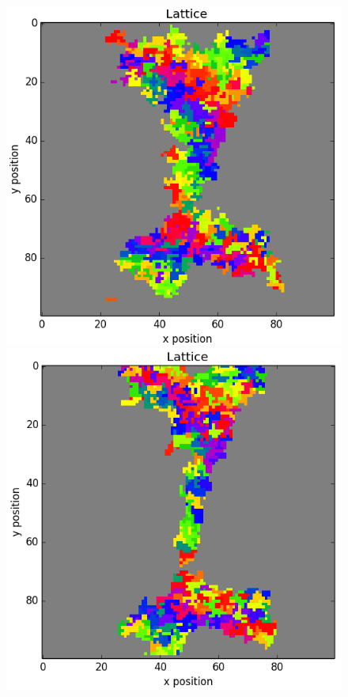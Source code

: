 \documentclass[12pt]{article}
\begin{document}
\begin{figure}[h]
	\includegraphics[scale=0.52]{img/nebula_9000}
	\includegraphics[scale=0.52]{img/nebula_13000}

\end{figure}
\end{document}
